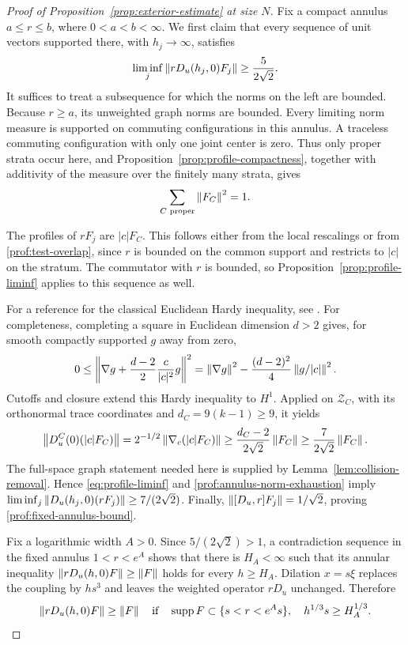 \begin{proof}[Proof of Proposition~\ref{prop:exterior-estimate} at size \(N\)]
Fix a compact annulus \(a\le r\le b\), where \(0<a<b<\infty\). We first
claim that every sequence of unit vectors supported there, with
\(h_j\to\infty\), satisfies
\begin{equation}\label{prof:fixed-annulus-bound}
 \liminf_j\left\lVert rD_u(h_j,0)F_j\right\rVert\ge\frac{5}{2\sqrt2}.
\end{equation}
It suffices to treat a subsequence for which the norms on the left are
bounded. Because \(r\ge a\), its unweighted graph norms are bounded.
Every limiting norm measure is supported on commuting configurations in
this annulus. A traceless commuting configuration with only one joint
center is zero. Thus only proper strata occur here, and
Proposition~\ref{prop:profile-compactness}, together with additivity of the
measure over the finitely many strata, gives
\begin{equation}\label{prof:annulus-norm-exhaustion}
                  \sum_{C\text{ proper}}\left\lVert F_C\right\rVert^2=1.
\end{equation}

The profiles of \(rF_j\) are \(|c|F_C\). This follows either from the
local rescalings or from \eqref{prof:test-overlap}, since \(r\) is bounded
on the common support and restricts to \(|c|\) on the stratum. The
commutator with \(r\) is bounded, so Proposition~\ref{prop:profile-liminf}
applies to this sequence as well.

For a reference for the classical Euclidean Hardy inequality, see
\cite[equation~(1.1), with $p=2$]{FrankSeiringer2008}.
For completeness, completing a square in Euclidean dimension \(d>2\)
gives, for smooth compactly supported \(g\) away from zero,
\[
 0\le\left\|\nabla g+\frac{d-2}{2}\frac{c}{|c|^2}g\right\|^2
 =\left\lVert \nabla g\right\rVert^2-\frac{(d-2)^2}{4}\left\lVert g/|c|\right\rVert^2.
\]
Cutoffs and closure extend this Hardy inequality to \(H^1\). Applied on
\(\mathcal Z_C\), with its orthonormal trace coordinates and \(d_C=9(k-1)\ge9\),
it yields
\[
 \left\lVert D_u^C(0)(|c|F_C)\right\rVert
 =2^{-1/2}\left\lVert \nabla_c(|c|F_C)\right\rVert
 \ge\frac{d_C-2}{2\sqrt2}\left\lVert F_C\right\rVert
 \ge\frac7{2\sqrt2}\left\lVert F_C\right\rVert.
\]
The full-space graph statement needed here is supplied by
Lemma~\ref{lem:collision-removal}. Hence
\eqref{eq:profile-liminf} and \eqref{prof:annulus-norm-exhaustion} imply
\(\liminf_j\left\lVert D_u(h_j,0)(rF_j)\right\rVert\ge7/(2\sqrt2)\).
Finally, \(\left\lVert [D_u,r]F_j\right\rVert=1/\sqrt2\), proving
\eqref{prof:fixed-annulus-bound}.

Fix a logarithmic width \(A>0\). Since \(5/(2\sqrt2)>1\), a contradiction
sequence in the fixed annulus \(1<r<e^A\) shows that there is \(H_A<\infty\)
such that its annular inequality \(\left\lVert rD_u(h,0)F\right\rVert\ge\left\lVert F\right\rVert\) holds
for every \(h\ge H_A\). Dilation \(x=s\xi\) replaces the coupling by
\(hs^3\) and leaves the weighted operator \(rD_u\) unchanged. Therefore
\begin{equation}\label{prof:scaled-annulus-bound}
 \left\lVert rD_u(h,0)F\right\rVert\ge\left\lVert F\right\rVert
 \quad\text{if}\quad
 \operatorname{supp} F\subset\{s<r<e^As\},\quad h^{1/3}s\ge H_A^{1/3}.
\end{equation}


\end{proof}
